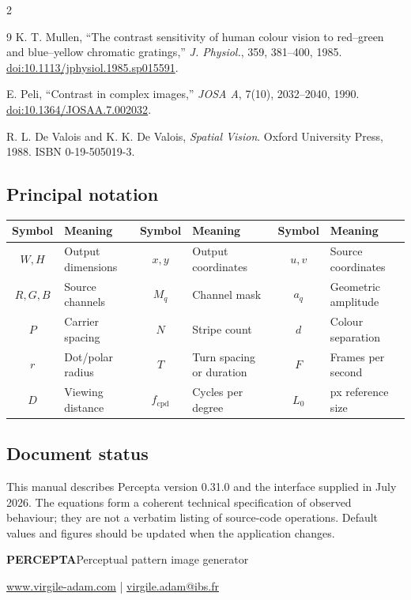 \begin{multicols}{2}
\begin{thebibliography}{9}
 K. T. Mullen, ``The contrast sensitivity of human colour vision to red--green and blue--yellow chromatic gratings,'' \emph{J. Physiol.}, 359, 381--400, 1985. \href{https://doi.org/10.1113/jphysiol.1985.sp015591}{doi:10.1113/jphysiol.1985.sp015591}.

 E. Peli, ``Contrast in complex images,'' \emph{JOSA A}, 7(10), 2032--2040, 1990. \href{https://doi.org/10.1364/JOSAA.7.002032}{doi:10.1364/JOSAA.7.002032}.

 R. L. De Valois and K. K. De Valois, \emph{Spatial Vision}. Oxford University Press, 1988. ISBN 0-19-505019-3.
\end{thebibliography}
\end{multicols}

\subsection{Principal notation}
\begin{table}[H]
\centering\footnotesize
\begin{tabularx}{\textwidth}{c >{\raggedright\arraybackslash}X c >{\raggedright\arraybackslash}X c >{\raggedright\arraybackslash}X}
\toprule
Symbol & Meaning & Symbol & Meaning & Symbol & Meaning \\
\midrule
$W,H$ & Output dimensions & $x,y$ & Output coordinates & $u,v$ & Source coordinates \\
$R,G,B$ & Source channels & $M_q$ & Channel mask & $a_q$ & Geometric amplitude \\
$P$ & Carrier spacing & $N$ & Stripe count & $d$ & Colour separation \\
$r$ & Dot/polar radius & $T$ & Turn spacing or duration & $F$ & Frames per second \\
$D$ & Viewing distance & $f_{\mathrm{cpd}}$ & Cycles per degree & $L_0$ & 1600 px reference size \\
\bottomrule
\end{tabularx}
\end{table}

\subsection{Document status}
This manual describes Percepta version 0.31.0 and the interface supplied in July 2026. The equations form a coherent technical specification of observed behaviour; they are not a verbatim listing of source-code operations. Default values and figures should be updated when the application changes.

\begin{tcolorbox}[colback=PerceptaNavy,colframe=PerceptaNavy,arc=2mm,boxrule=0pt,left=4mm,right=4mm,top=2.5mm,bottom=2.5mm]
\centering\color{white}
{\large\bfseries PERCEPTA}\quad Perceptual pattern image generator\par
\href{https://www.virgile-adam.com}{\color{PerceptaGreen}www.virgile-adam.com}
\quad|\quad
\href{mailto:virgile.adam@ibs.fr}{\color{PerceptaBlue}virgile.adam@ibs.fr}
\end{tcolorbox}

